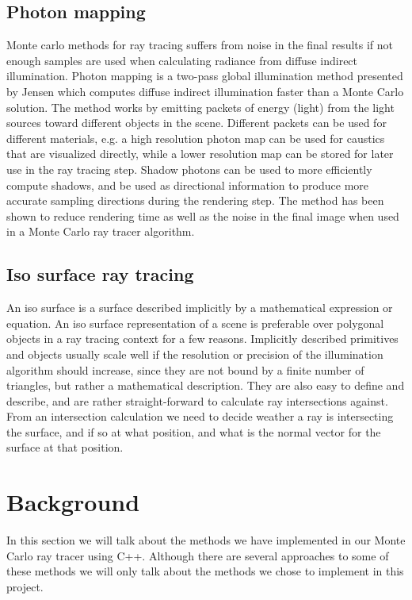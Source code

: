 \documentclass[a4paper, 12pt]{report}
\begin{document}
\section{Photon mapping}
Monte carlo methods for ray tracing suffers from noise in the final results if not enough samples are used when calculating radiance from diffuse indirect illumination.
Photon mapping is a two-pass global illumination method presented by Jensen \cite{photon_maps} which computes diffuse indirect illumination faster than a Monte Carlo solution.
The method works by emitting packets of energy (light) from the light sources toward different objects in the scene.
Different packets can be used for different materials, e.g. a high resolution photon map can be used for caustics that are visualized directly, while a lower resolution map can be stored for later use in the ray tracing step.
Shadow photons can be used to more efficiently compute shadows, and be used as directional information to produce more accurate sampling directions during the rendering step.
The method has been shown to reduce rendering time as well as the noise in the final image when used in a Monte Carlo ray tracer algorithm.
  
\section{Iso surface ray tracing}
An iso surface is a surface described implicitly by a mathematical expression or equation. 
An iso surface representation of a scene is preferable over polygonal objects in a ray tracing context for a few reasons. Implicitly described primitives and objects usually scale well if the resolution or precision of the illumination algorithm should increase, since they are not bound by a finite number of triangles, but rather a mathematical description. 
They are also easy to define and describe, and are rather straight-forward to calculate ray intersections against. 
From an intersection calculation we need to decide weather a ray is intersecting the surface, and if so at what position, and what is the normal vector for the surface at that position. 

\chapter{Background} \label{ch:background}

In this section we will talk about the methods we have implemented in our Monte Carlo ray tracer using C++. 
Although there are several approaches to some of these methods we will only talk about the methods we chose to implement in this project.
\end{document}
